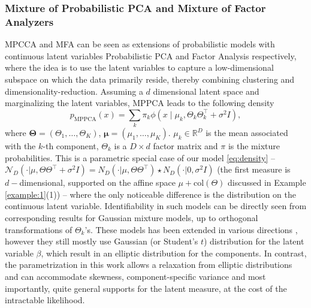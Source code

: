 \documentclass[bj,authoryear]{imsart}
\theoremstyle{plain}
\theoremstyle{remark}
\def\bTheta{{\boldsymbol\Theta}}
\def\bmu{{\boldsymbol\mu}}
\def\bbR{\mathbb{R}}
\def\cN{\mathcal{N}}
\def\bTheta{\boldsymbol{\Theta}}
\begin{document}
\subsubsection*{Mixture of Probabilistic PCA and Mixture of Factor Analyzers}
MPCCA \cite{tipping1999mixtures} and MFA \cite{mclachlan2003modelling} can be seen as extensions of probabilistic models with continuous latent variables Probabilistic PCA \cite{tipping1999probabilistic} and Factor Analysis \cite{kim1978introduction} respectively, where the idea is to use the latent variables to capture a low-dimensional subspace on which the data primarily reside, thereby combining clustering and dimensionality-reduction. Assuming a $d$ dimensional latent space and marginalizing the latent variables, MPPCA leads to the following density
$$p_{\text{MPPCA}}(x) = \sum_k \pi_k \phi(x\mid \mu_k, \Theta_k\Theta_k^\top + \sigma^2 I),$$
where $\bTheta=(\Theta_1,\dots,\Theta_K)$, $\bmu=(\mu_1,\dots,\mu_K)$. $\mu_k\in\bbR^D$ is the mean associated with the $k$-th component, $\Theta_k$ is a $D\times d$ factor matrix  and $\pi$ is the mixture probabilities.
This is a parametric special case of our model \eqref{eq:density} -- $\cN_D(\cdot|\mu, \Theta\Theta^\top + \sigma^2 I) = N_D(\cdot|\mu, \Theta\Theta^\top)\star N_D(\cdot|0, \sigma^2 I)$ (the first measure is $d-$dimensional, supported on the affine space $\mu+\text{col}(\Theta)$ discussed in Example \ref{example:1}(1)) -- where the only noticeable difference is the distribution on the continuous latent variable. 
Identifiability in such models can be directly seen from corresponding results for Gaussian mixture models, up to orthogonal transformations of $\Theta_k$'s. These models has been extended in various directions \cite{collas2021probabilistic, han2015covariance, archambeau2008mixtures, xu2023hemppcat, lee2021mixtures}, however they still mostly use Gaussian (or Student's $t$) distribution for the latent variable $\beta$, which result in an elliptic distribution for the components. In contrast, the parametrization in this work allows a relaxation from elliptic distributions and can accommodate skewness, component-specific variance and most importantly, quite general supports for the latent measure, at the cost of the intractable likelihood.
\end{document}

